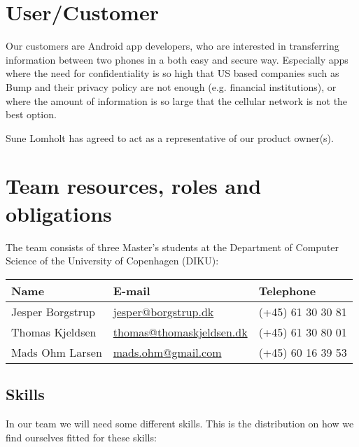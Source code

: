 \documentclass[a4paper,11pt]{article}
\begin{document}

\section{User/Customer} %
\label{sec:user_customer}

Our customers are Android app developers, who are interested in transferring information between two phones in a both easy and secure way. Especially apps where the need for confidentiality is so high that US based companies such as Bump and their privacy policy are not enough (e.g. financial institutions), or where the amount of information is so large that the cellular network is not the best option.

Sune Lomholt has agreed to act as a representative of our product owner(s).


\section{Team resources, roles and obligations} %
\label{sec:team_resources_roles_and_obligations}
The team consists of three Master's students at the Department of Computer Science of the University of Copenhagen (DIKU): \\

\begin{tabular}{|p{4.5cm}|p{5cm}|p{3.5cm}|}
\hline
\textbf{Name}    & E-mail				          &	Telephone         \\\hline
Jesper Borgstrup & \href{mailto:jesper@borgstrup.dk}{jesper@borgstrup.dk} 	  & (+45) 61 30 30 81 \\\hline
Thomas Kjeldsen  & \href{mailto:thomas@thomaskjeldsen.dk}{thomas@thomaskjeldsen.dk} & (+45) 61 30 80 01 \\\hline
Mads Ohm Larsen  & \href{mailto:mads.ohm@gmail.com}{mads.ohm@gmail.com} & (+45) 60 16 39 53 \\\hline
\end{tabular}

\subsection{Skills} %
\label{subsec:skills}
In our team we will need some different skills.
This is the distribution on how we find ourselves fitted for these skills: \\
\end{document}
